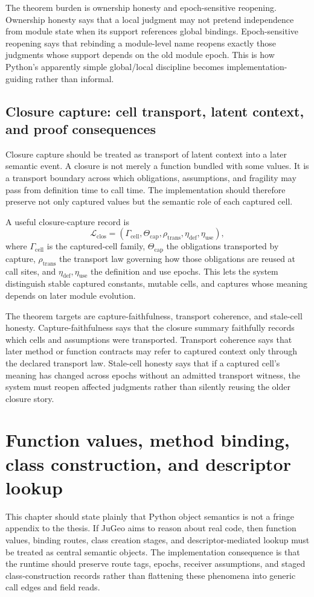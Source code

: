 \documentclass[11pt]{report}
\begin{document}
The theorem burden is ownership honesty and epoch-sensitive reopening. Ownership honesty says that a local judgment may not pretend independence from module state when its support references global bindings. Epoch-sensitive reopening says that rebinding a module-level name reopens exactly those judgments whose support depends on the old module epoch. This is how Python's apparently simple global/local discipline becomes implementation-guiding rather than informal.
\section{Closure capture: cell transport, latent context, and proof consequences}
Closure capture should be treated as transport of latent context into a later semantic event. A closure is not merely a function bundled with some values. It is a transport boundary across which obligations, assumptions, and fragility may pass from definition time to call time. The implementation should therefore preserve not only captured values but the semantic role of each captured cell.

A useful closure-capture record is
\[
\mathcal{L}_{\mathrm{clos}} = (\Gamma_{\mathrm{cell}}, \Theta_{\mathrm{cap}}, \rho_{\mathrm{trans}}, \eta_{\mathrm{def}}, \eta_{\mathrm{use}}),
\]
where $\Gamma_{\mathrm{cell}}$ is the captured-cell family, $\Theta_{\mathrm{cap}}$ the obligations transported by capture, $\rho_{\mathrm{trans}}$ the transport law governing how those obligations are reused at call sites, and $\eta_{\mathrm{def}}, \eta_{\mathrm{use}}$ the definition and use epochs. This lets the system distinguish stable captured constants, mutable cells, and captures whose meaning depends on later module evolution.

The theorem targets are capture-faithfulness, transport coherence, and stale-cell honesty. Capture-faithfulness says that the closure summary faithfully records which cells and assumptions were transported. Transport coherence says that later method or function contracts may refer to captured context only through the declared transport law. Stale-cell honesty says that if a captured cell's meaning has changed across epochs without an admitted transport witness, the system must reopen affected judgments rather than silently reusing the older closure story.
\chapter{Function values, method binding, class construction, and descriptor lookup}
This chapter should state plainly that Python object semantics is not a fringe appendix to the thesis. If JuGeo aims to reason about real code, then function values, binding routes, class creation stages, and descriptor-mediated lookup must be treated as central semantic objects. The implementation consequence is that the runtime should preserve route tags, epochs, receiver assumptions, and staged class-construction records rather than flattening these phenomena into generic call edges and field reads.
\end{document}
